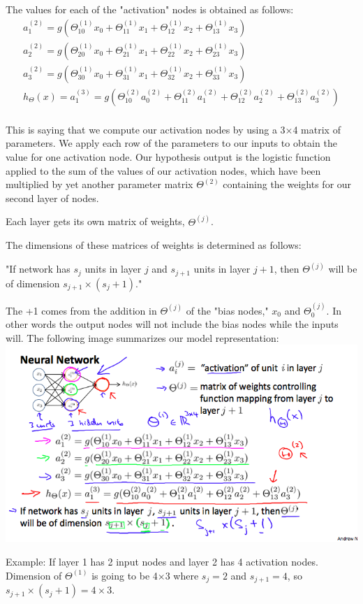 \documentclass{report}
\begin{document}
The values for each of the "activation" nodes is obtained as follows:
\begin{align*} 
	a_1^{(2)} = g(\Theta_{10}^{(1)}x_0 + \Theta_{11}^{(1)}x_1 + \Theta_{12}^{(1)}x_2 + \Theta_{13}^{(1)}x_3) \\ 
	a_2^{(2)} = g(\Theta_{20}^{(1)}x_0 + \Theta_{21}^{(1)}x_1 + \Theta_{22}^{(1)}x_2 + \Theta_{23}^{(1)}x_3) \\ 
	a_3^{(2)} = g(\Theta_{30}^{(1)}x_0 + \Theta_{31}^{(1)}x_1 + \Theta_{32}^{(1)}x_2 + \Theta_{33}^{(1)}x_3) \\ 
	h_\Theta(x) = a_1^{(3)} = g(\Theta_{10}^{(2)}a_0^{(2)} + \Theta_{11}^{(2)}a_1^{(2)} + \Theta_{12}^{(2)}a_2^{(2)} + \Theta_{13}^{(2)}a_3^{(2)}) \\ 
\end{align*}

This is saying that we compute our activation nodes by using a 3×4 matrix of parameters. We apply each row of the parameters to our inputs to obtain the value for one activation node. Our hypothesis output is the logistic function applied to the sum of the values of our activation nodes, which have been multiplied by yet another parameter matrix $\Theta^{(2)}$ containing the weights for our second layer of nodes.

Each layer gets its own matrix of weights, $\Theta^{(j)}$.

The dimensions of these matrices of weights is determined as follows:

"If network has $s_j$ units in layer $j$ and $s_{j+1}$ units in layer $j+1$, then $\Theta^{(j)}$ will be of dimension $s_{j+1} \times (s_j + 1)$."

The +1 comes from the addition in $\Theta^{(j)}$ of the "bias nodes," $x_0$ and $\Theta_0^{(j)}$. In other words the output nodes will not include the bias nodes while the inputs will. The following image summarizes our model representation:\\
\includegraphics[width=\textwidth]{model_representation.png}
 
Example: If layer 1 has 2 input nodes and layer 2 has 4 activation nodes. Dimension of $\Theta^{(1)}$ is going to be 4×3 where $s_j = 2$ and $s_{j+1} = 4$, so $s_{j+1} \times (s_j + 1) = 4 \times 3$.
\end{document}
